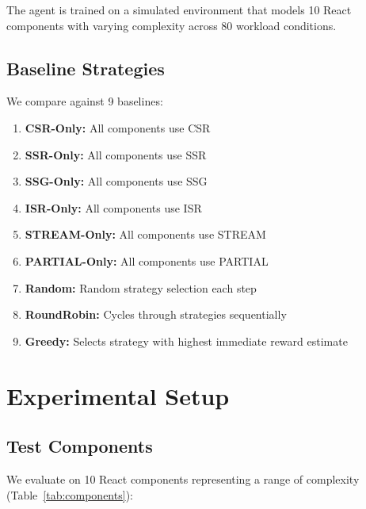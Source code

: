 \documentclass[10pt,twocolumn]{article}
\begin{document}
The agent is trained on a simulated environment that models 10 React components with varying complexity across 80 workload conditions.

\subsection{Baseline Strategies}

We compare against 9 baselines:

\begin{enumerate}[nosep]
\item \textbf{CSR-Only:} All components use CSR
\item \textbf{SSR-Only:} All components use SSR
\item \textbf{SSG-Only:} All components use SSG
\item \textbf{ISR-Only:} All components use ISR
\item \textbf{STREAM-Only:} All components use STREAM
\item \textbf{PARTIAL-Only:} All components use PARTIAL
\item \textbf{Random:} Random strategy selection each step
\item \textbf{RoundRobin:} Cycles through strategies sequentially
\item \textbf{Greedy:} Selects strategy with highest immediate reward estimate
\end{enumerate}

\section{Experimental Setup}
\label{sec:experimental}

\subsection{Test Components}

We evaluate on 10 React components representing a range of complexity (Table~\ref{tab:components}):
\end{document}

